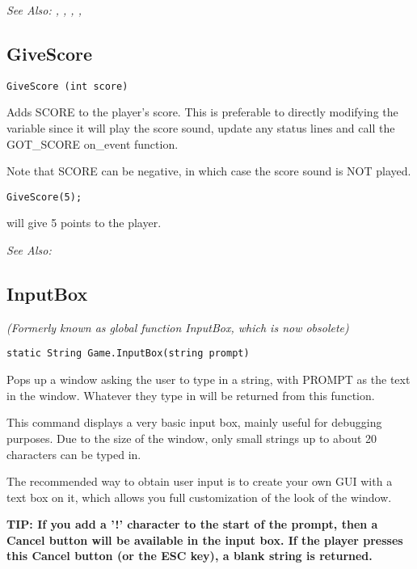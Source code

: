 \it{See Also:} ,
,
,
, 


\subsection{GiveScore}\label{GiveScore}%

\begin{verbatim}
GiveScore (int score)
\end{verbatim}
Adds SCORE to the player's score. This is preferable to directly modifying
the variable since it will play the score sound, update any status lines
and call the GOT_SCORE on_event function.

Note that SCORE can be negative, in which case the score sound is NOT played.

\begin{verbatim}
GiveScore(5);
\end{verbatim}
will give 5 points to the player.

\it{See Also:} 


\subsection{InputBox}\label{Game.InputBox}%

\it{(Formerly known as global function InputBox, which is now obsolete)}

\begin{verbatim}
static String Game.InputBox(string prompt)
\end{verbatim}
Pops up a window asking the user to type in a string, with PROMPT as the
text in the window. Whatever they type in will be returned from this function.

This command displays a very basic input box, mainly useful for debugging
purposes. Due to the size of the window, only small strings up to about 20
characters can be typed in.

The recommended way to obtain user input is to create your own GUI with a text
box on it, which allows you full customization of the look of the window.

\bf{TIP:} If you add a '!' character to the start of the prompt, then a Cancel button will be
available in the input box. If the player presses this Cancel button (or the ESC key),
a blank string is returned.

